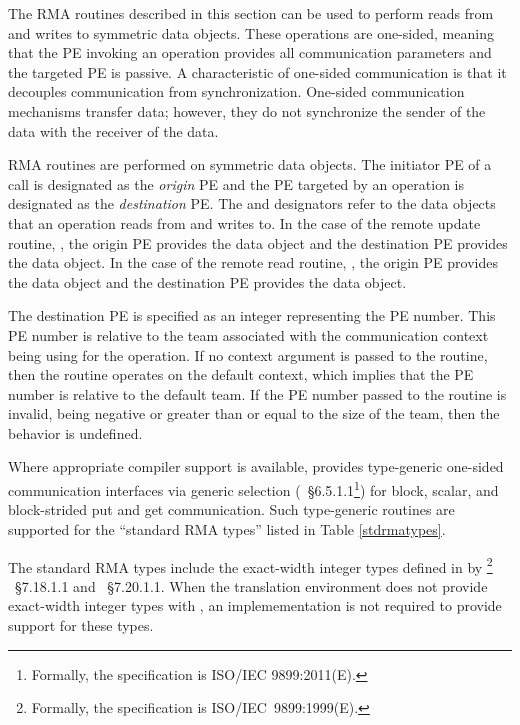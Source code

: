 The \ac{RMA} routines described in this section can be used to perform
reads from and writes to symmetric data objects. These operations
are one-sided, meaning that the \ac{PE} invoking an operation provides all
communication parameters and the targeted \ac{PE} is passive. A characteristic
of one-sided communication is that it decouples communication from
synchronization. One-sided communication mechanisms transfer data; however,
they do not synchronize the sender of the data with the receiver of the data.

\openshmem \ac{RMA} routines are performed on symmetric data objects.  The
initiator \ac{PE} of a call is designated as the \emph{origin} \ac{PE} and the
\ac{PE} targeted by an operation is designated as the \emph{destination} \ac{PE}.  The
\source{} and \dest{} designators refer to the data objects that an operation
reads from and writes to.  In the case of the remote update routine, \PUT{},
the origin \ac{PE} provides the \source{} data object and the destination
\ac{PE} provides the \dest{} data object. In the case of the remote read
routine, \GET{}, the origin \ac{PE} provides the \dest{} data object and the
destination \ac{PE} provides the \source{} data object.

{
\color{Green}
The destination \ac{PE} is specified as an integer representing the \ac{PE} number.
This \ac{PE} number is relative to the team associated with the
communication context being using for the operation. If no context argument is passed to the routine,
then the routine operates on the default context, which implies that
the \ac{PE} number is relative to the default team.
If the \ac{PE} number passed to the routine is invalid, being negative
or greater than or equal to the size of the \openshmem team, then the behavior is undefined.
}

Where appropriate compiler support is available, \openshmem provides type-generic 
one-sided communication interfaces via \Cstd[11] generic selection
(\Cstd[11]~\S6.5.1.1\footnote{Formally, the \Cstd[11] specification is ISO/IEC 9899:2011(E).})
for block, scalar, and block-strided put and get communication. 
Such type-generic routines are supported for the ``standard \ac{RMA} types''
listed in Table \ref{stdrmatypes}.

The standard \ac{RMA} types include the exact-width integer types defined in
 by \Cstd[99]%
\footnote{Formally, the \Cstd[99] specification is ISO/IEC~9899:1999(E).}%
~\S7.18.1.1 and \Cstd[11]~\S7.20.1.1. When the \Cstd translation environment
does not provide exact-width integer types with , an
\openshmem implemementation is not required to provide support for these types.

